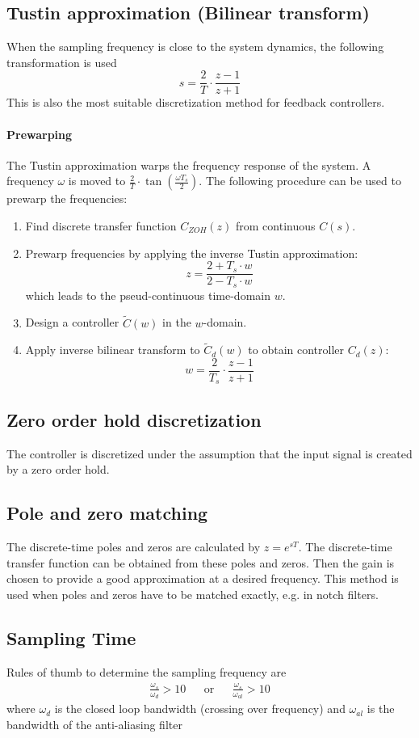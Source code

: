 \subsection{Tustin approximation (Bilinear transform)}
When the sampling frequency is close to the system dynamics, the following transformation is used
\[
    s = \frac{2}{T} \cdot \frac{z - 1}{z + 1}
\]
This is also the most suitable discretization method for feedback controllers.

\paragraph{Prewarping}
The Tustin approximation warps the frequency response of the system.
A frequency $\omega$ is moved to $\frac{2}{T} \cdot \tan(\frac{\omega T_s}{2})$.
The following procedure can be used to prewarp the frequencies:
\begin{enumerate}
    \item Find discrete transfer function $C_{ZOH}(z)$ from continuous $C(s)$.
    \item Prewarp frequencies by applying the inverse Tustin approximation:
        \[
            z = \frac{2 + T_s \cdot w}{2 - T_s \cdot w}
        \]
        which leads to the pseud-continuous time-domain $w$.
    \item Design a controller $\tilde{C}(w)$ in the $w$-domain.
    \item Apply inverse bilinear transform to $\tilde{C}_d(w)$ to obtain controller $C_d(z)$:
        \[
            w = \frac{2}{T_s} \cdot \frac{z - 1}{z + 1}
        \]
\end{enumerate}

\subsection{Zero order hold discretization}
The controller is discretized under the assumption that the input signal is created by a zero order hold.

\subsection{Pole and zero matching}
The discrete-time poles and zeros are calculated by $z = e^{s T}$.
The discrete-time transfer function can be obtained from these poles and zeros.
Then the gain is chosen to provide a good approximation at a desired frequency.
This method is used when poles and zeros have to be matched exactly, e.g. in notch filters.

\subsection{Sampling Time}
Rules of thumb to determine the sampling frequency are
\begin{align*}
    \frac{\omega_s}{\omega_d} > 10 && \text{or} &&
    \frac{\omega_s}{\omega_{al}} > 10
\end{align*}
where $\omega_d$ is the closed loop bandwidth (crossing over frequency) and $\omega_{al}$ is
the bandwidth of the anti-aliasing filter
